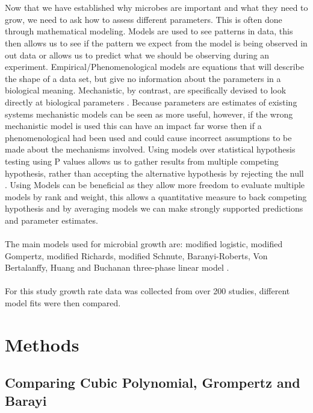 \documentclass{article}
\begin{document}
	\\
	\\
	Now that we have established why microbes are important and what they need to grow, we need to ask how to assess different parameters. This is often done through mathematical modeling. Models are used to see patterns in data, this then allows us to see if the pattern we expect from the model is being observed in out data or allows us to predict what we should be observing during an experiment. Empirical/Phenomenological models are equations that will describe the shape of a data set, but give no information about the parameters in a biological meaning. Mechanistic, by contrast, are specifically devised to look directly at biological parameters \autocite{MotulskyFittingGlance}. Because parameters are estimates of existing systems mechanistic models can be seen as more useful, however, if the wrong mechanistic model is used this can have an impact far worse then if a phenomenological had been used and could cause incorrect assumptions to be made about the mechanisms involved. Using models over statistical hypothesis testing using P values allows us to gather results from multiple competing hypothesis, rather than accepting the alternative hypothesis by rejecting the null \autocite{Johnson2004ModelEvolution}. Using Models can be beneficial as they allow more freedom to evaluate multiple models by rank and weight, this allows a quantitative measure to back competing hypothesis and by averaging models we can make strongly supported predictions and parameter estimates.
	\\
	\\
	The main models used for microbial growth are: modified  logistic,  modified  Gompertz,  modified  Richards,  modified  Schnute,  Baranyi-Roberts, Von Bertalanffy, Huang and Buchanan  three-phase linear model \autocite{MohdYunusAbdShukor2014Evaluation1}. 
	\\
	\\
	For this study growth rate data was collected from over 200 studies, different model fits were then compared.
	
	
	
	\section{Methods}
	
	\subsection{Comparing Cubic Polynomial, Grompertz and Barayi}
	
\end{document}
